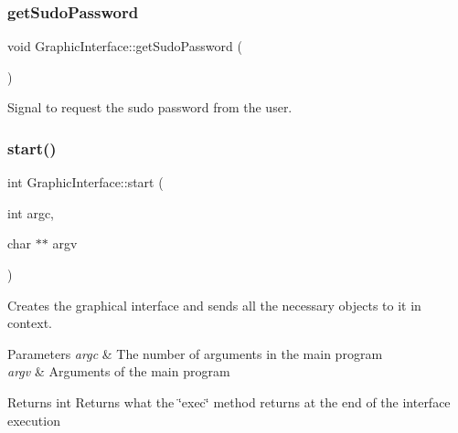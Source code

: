 \mbox{\label{class_graphic_interface_a528427458ccde6148b32599b1d02a299}} 
\subsubsection{\texorpdfstring{get\+Sudo\+Password}{getSudoPassword}}
{\footnotesize\ttfamily void Graphic\+Interface\+::get\+Sudo\+Password (\begin{DoxyParamCaption}{ }\end{DoxyParamCaption})\hspace{0.3cm}{\ttfamily [signal]}}



Signal to request the sudo password from the user. 

\mbox{\label{class_graphic_interface_a41d17554d5ec2b24601f34304ce1c3cf}} 
\subsubsection{\texorpdfstring{start()}{start()}}
{\footnotesize\ttfamily int Graphic\+Interface\+::start (\begin{DoxyParamCaption}\item[{int}]{argc,  }\item[{char $\ast$$\ast$}]{argv }\end{DoxyParamCaption})\hspace{0.3cm}{\ttfamily [virtual]}}



Creates the graphical interface and sends all the necessary objects to it in context. 


\begin{DoxyParams}{Parameters}
{\em argc} & The number of arguments in the main program \\
\hline
{\em argv} & Arguments of the main program \\
\hline
\end{DoxyParams}
\begin{DoxyReturn}{Returns}
int Returns what the \char`\"{}exec\char`\"{} method returns at the end of the interface execution 
\end{DoxyReturn}


